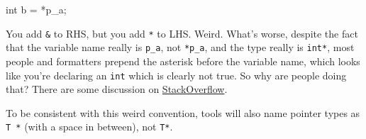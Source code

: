 \documentclass[
]{book}
\newenvironment{Shaded}{\begin{snugshade}}{\end{snugshade}}
\newcommand{\DataTypeTok}[1]{\textcolor[rgb]{0.13,0.29,0.53}{#1}}
\newcommand{\NormalTok}[1]{#1}
\begin{document}
\begin{Shaded}
\begin{Highlighting}[]
\DataTypeTok{int}\NormalTok{ b = *p\_a;}
\end{Highlighting}
\end{Shaded}

You add \texttt{\&} to RHS, but you add \texttt{*} to LHS. Weird. What's worse, despite the fact that the variable name really is \texttt{p\_a}, not \texttt{*p\_a}, and the type really is \texttt{int*}, most people and formatters prepend the asterisk before the variable name, which looks like you're declaring an \texttt{int} which is clearly not true. So why are people doing that? There are some discussion on \href{https://stackoverflow.com/questions/398395/why-is-the-asterisk-before-the-variable-name-rather-than-after-the-type}{StackOverflow}.

To be consistent with this weird convention, tools will also name pointer types as \texttt{\textasciigrave{}T\ *\textasciigrave{}} (with a space in between), not \texttt{\textasciigrave{}T*\textasciigrave{}}.

  
\end{document}
